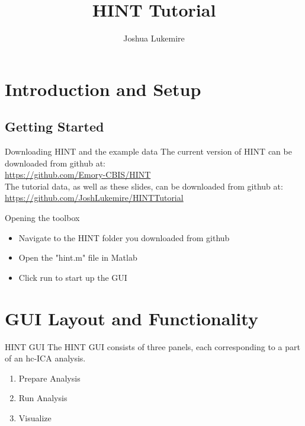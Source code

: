 \documentclass[11pt]{beamer}
\author{Joshua Lukemire}
\title{HINT Tutorial}
\begin{document}
\begin{frame}
\titlepage
\end{frame}

\begin{frame}
\tableofcontents
\end{frame}

\section{Introduction and Setup}

\subsection{Getting Started}

\begin{frame}{Downloading HINT and the example data}
The current version of HINT can be downloaded from github at:\\
\url{https://github.com/Emory-CBIS/HINT} \\
\medskip
The tutorial data, as well as these slides, can be downloaded from github at:\\
\url{https://github.com/JoshLukemire/HINTTutorial}
\end{frame}

\begin{frame}{Opening the toolbox}
\begin{itemize}
\item Navigate to the HINT folder you downloaded from github
\item Open the "hint.m" file in Matlab
\item Click run to start up the GUI
\end{itemize}
\end{frame}

\section{GUI Layout and Functionality}

\begin{frame}{HINT GUI}
The HINT GUI consists of three panels, each corresponding to a part of an hc-ICA analysis.

\begin{enumerate}
\item Prepare Analysis
\item Run Analysis
\item Visualize
\end{enumerate}
\end{frame}
\end{document}
